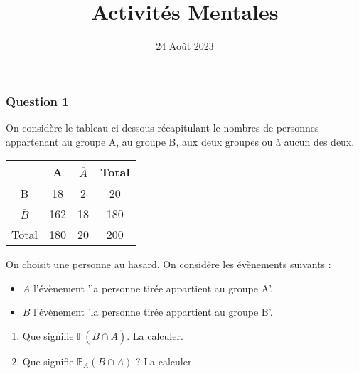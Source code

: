 \documentclass[15pt, mathserif]{beamer}
\title{Activités Mentales}
\date{24 Août 2023}
\begin{document}
\begin{frame}
    \titlepage
\end{frame}

\begin{frame} 
	\frametitle{Question 1}
On considère le tableau ci-dessous récapitulant le nombres de personnes appartenant au groupe A, au groupe B, aux deux groupes ou à aucun des deux.\begin{center} 
 \begin{tabular}{|c|c|c|c|} 
 \cline{2-4} 
 \multicolumn{1}{c|}{} & A & $\overline{A}$ & Total \\\hline 
 B   &18  &2& 20 \\\hline 
 $\overline{B}$   &162 & 18 & 180 \\\hline 
 Total   &180&20 &200 \\\hline  
 \end{tabular} 
 \end{center} On choisit une personne au hasard. On considère les évènements suivants : 
 \begin{itemize} 
 \item $A$ l'évènement 'la personne tirée appartient au groupe A'. 
 \item $B$ l'évènement 'la personne tirée appartient au groupe B'. 
 \end{itemize} 
 \begin{enumerate} 
 \item Que signifie  $\mathbb{P}(\overline{B} \cap A)$. La calculer. 
 \item Que signifie $\mathbb{P}_{A} (B \cap A)$ ? La calculer. 
  \end{enumerate} 
 \end{frame}
\end{document}
